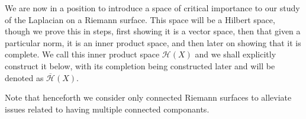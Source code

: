 \documentclass[11pt]{report}
\newtheorem{thm}{Theorem}[section]
\theoremstyle{definition}
\newtheorem{defn}[thm]{Definition}
\begin{document}


We are now in a position to introduce a space of critical importance to our study of the Laplacian on a Riemann surface. This space will be a Hilbert space, though we prove this in steps, first showing it is a vector space, then that given a particular norm, it is an inner product space, and then later on showing that it is complete. We call this inner product space $\mathcal{H}(X)$ and we shall explicitly construct it below, with its completion being constructed later and will be denoted as $\overline{\mathcal{H}}(X)$. 

Note that henceforth we consider only connected Riemann surfaces to alleviate  issues related to having multiple connected componants.


\end{document}
